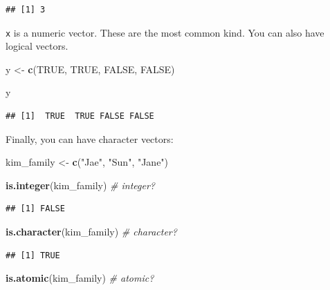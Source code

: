 \documentclass[
]{book}
\newenvironment{Shaded}{\begin{snugshade}}{\end{snugshade}}
\newcommand{\CommentTok}[1]{\textcolor[rgb]{0.56,0.35,0.01}{\textit{#1}}}
\newcommand{\ConstantTok}[1]{\textcolor[rgb]{0.56,0.35,0.01}{#1}}
\newcommand{\FunctionTok}[1]{\textcolor[rgb]{0.13,0.29,0.53}{\textbf{#1}}}
\newcommand{\NormalTok}[1]{#1}
\newcommand{\OtherTok}[1]{\textcolor[rgb]{0.56,0.35,0.01}{#1}}
\newcommand{\StringTok}[1]{\textcolor[rgb]{0.31,0.60,0.02}{#1}}
\begin{document}
\begin{verbatim}
## [1] 3
\end{verbatim}

\texttt{x} is a numeric vector. These are the most common kind. You can also have logical vectors.

\begin{Shaded}
\begin{Highlighting}[]
\NormalTok{y }\OtherTok{\textless{}{-}} \FunctionTok{c}\NormalTok{(}\ConstantTok{TRUE}\NormalTok{, }\ConstantTok{TRUE}\NormalTok{, }\ConstantTok{FALSE}\NormalTok{, }\ConstantTok{FALSE}\NormalTok{)}

\NormalTok{y}
\end{Highlighting}
\end{Shaded}

\begin{verbatim}
## [1]  TRUE  TRUE FALSE FALSE
\end{verbatim}

Finally, you can have character vectors:

\begin{Shaded}
\begin{Highlighting}[]
\NormalTok{kim\_family }\OtherTok{\textless{}{-}} \FunctionTok{c}\NormalTok{(}\StringTok{"Jae"}\NormalTok{, }\StringTok{"Sun"}\NormalTok{, }\StringTok{"Jane"}\NormalTok{)}

\FunctionTok{is.integer}\NormalTok{(kim\_family) }\CommentTok{\# integer?}
\end{Highlighting}
\end{Shaded}

\begin{verbatim}
## [1] FALSE
\end{verbatim}

\begin{Shaded}
\begin{Highlighting}[]
\FunctionTok{is.character}\NormalTok{(kim\_family) }\CommentTok{\# character?}
\end{Highlighting}
\end{Shaded}

\begin{verbatim}
## [1] TRUE
\end{verbatim}

\begin{Shaded}
\begin{Highlighting}[]
\FunctionTok{is.atomic}\NormalTok{(kim\_family) }\CommentTok{\# atomic?}
\end{Highlighting}
\end{Shaded}
\end{document}

